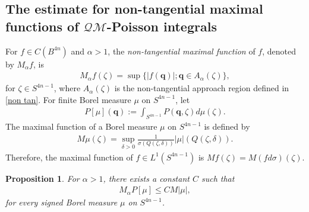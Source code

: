 \documentclass[a4paper,11pt]{amsart}
\numberwithin{equation}{section}
\newtheorem{prop}{Proposition}[section]
\begin{document}
\subsection{The estimate for non-tangential maximal functions of $\mathcal{QM}$-Poisson integrals}
For $f\in C(B^{4n})$ and $\alpha>1$, the \emph{non-tangential maximal function} of $f$, denoted by $M_{\alpha}f$, is
\begin{equation*}\begin{aligned}
M_{\alpha}f(\zeta)=\sup\{|f(\mathbf{q})|;\mathbf{q}\in A_{\alpha}(\zeta)\},
\end{aligned}\end{equation*}
for $\zeta\in S^{4n-1}$, where $A_{\alpha}(\zeta)$ is the non-tangential approach region defined in \eqref{non tan}. For finite Borel measure $\mu$ on $S^{4n-1}$, let
\begin{equation*}\begin{aligned}
P[\mu](\mathbf{q}):=\int_{S^{4n-1}}P(\mathbf{q},\zeta)d\mu(\zeta).
\end{aligned}\end{equation*}
The maximal function of a Borel measure $\mu$ on $S^{4n-1}$ is
defined by
\begin{equation}\begin{aligned}
M\mu(\zeta)=\sup_{\delta>0}\frac{1}{\sigma(Q(\zeta, \delta))}|\mu|(Q(\zeta, \delta)).
\end{aligned}\end{equation}
Therefore, the maximal function of $f\in L^1(S^{4n-1})$ is $Mf(\zeta)=M(fd\sigma)(\zeta)$.
\begin{prop}\label{MAPleqMu}
For $\alpha>1$, there exists a constant $C$ such that
\begin{equation*}\begin{aligned}
M_{\alpha}P[\mu]\leq CM|\mu|,
\end{aligned}\end{equation*}
for every signed Borel measure $\mu$ on $S^{4n-1}$.
\end{prop}
\end{document}
